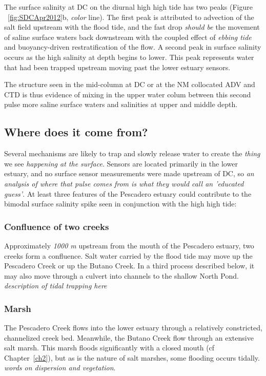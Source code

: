 The surface salinity at DC on the diurnal high high tide has two peaks (Figure ~\ref{fig:SDCApr2012}b, \emph{color} line). The first peak is attributed to advection of the salt field upstream with the flood tide, and the fast drop \emph{should be} the movement of saline surface waters back downstream with the coupled effect of \emph{ebbing tide} and buoyancy-driven restratification of the flow. A second peak in surface salinity occurs as the high salinity at depth begins to lower. This peak represents water that had been trapped upstream moving past the lower estuary sensors. 

The structure seen in the mid-column at DC or at the NM collocated ADV and CTD is thus evidence of mixing in the upper water colum between this second pulse more saline surface waters and salinities at upper and middle depth. 

\subsection{Where does it come from?}

Several mechanisms are likely to trap and slowly release water to create the \emph{thing} we see \emph{happening at the surface}. Sensors are located primarily in the lower estuary, and no surface sensor measurements were made upstream of DC, so \emph{an analysis of where that pulse comes from is what they would call an 'educated guess'}. At least three features of the Pescadero estuary could contribute to the bimodal surface salinity spike seen in conjunction with the high high tide:

\subsubsection{Confluence of two creeks}
Approximately \emph{1000 m} upstream from the mouth of the Pescadero estuary, two creeks form a confluence. Salt water carried by the flood tide may move up the Pescadero Creek or up the Butano Creek. In a third process described below, it may also move through a culvert into channels to the shallow North Pond. \emph{description of tidal trapping here}

\subsubsection{Marsh}
The Pescadero Creek flows into the lower estuary through a relatively constricted, channelized creek bed.  Meanwhile, the Butano Creek flow through an extensive salt marsh. This marsh floods significantly with a closed mouth (cf Chapter~\ref{ch2}), but as is the nature of salt marshes, some flooding occurs tidally. \emph{words on dispersion and vegetation}. 


